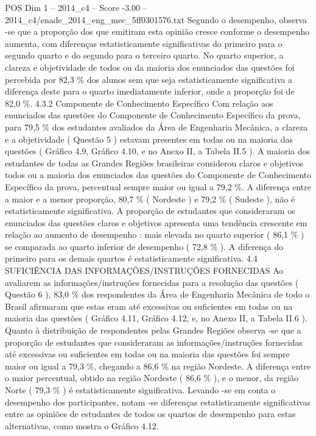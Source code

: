 \begin{textsample}{POS Dim 1 – 2014\_c4 – Score -3.00 – 2014\_c4/enade\_2014\_eng\_mec\_5ff0301576.txt}
Segundo o desempenho, observa -se que a proporção dos que emitiram esta opinião cresce conforme o desempenho aumenta, com diferenças estatisticamente significativas do primeiro para o segundo quarto e do segundo para o terceiro quarto.
No quarto superior, a clareza e objetividade de todos ou da maioria dos enunciados das questões foi percebida por 82,3 \% dos alunos sem que seja estatisticamente significativa a diferença deste para o quarto imediatamente inferior, onde a proporção foi de 82,0 \%. 4.3.2 Componente de Conhecimento Específico Com relação aos enunciados das questões do Componente de Conhecimento Específico da prova, para 79,5 \% dos estudantes avaliados da Área de Engenharia Mecânica, a clareza e a objetividade ( Questão 5 ) estavam presentes em todas ou na maioria das questões ( Gráfico 4.9, Gráfico 4.10, e no Anexo II, a Tabela II.5 ).
A maioria dos estudantes de todas as Grandes Regiões brasileiras considerou claros e objetivos todos ou a maioria dos enunciados das questões do Componente de Conhecimento Específico da prova, percentual sempre maior ou igual a 79,2 \%.
A diferença entre a maior e a menor proporção, 80,7 \% ( Nordeste ) e 79,2 \% ( Sudeste ), não é estatisticamente significativa.
A proporção de estudantes que consideraram os enunciados das questões claros e objetivos apresenta uma tendência crescente em relação ao aumento de desempenho : mais elevada no quarto superior ( 86,1 \% ) se comparada ao quarto inferior de desempenho ( 72,8 \% ).
A diferença do primeiro para os demais quartos é estatisticamente significativa. 4.4 SUFICIÊNCIA DAS INFORMAÇÕES/INSTRUÇÕES FORNECIDAS Ao avaliarem as informações/instruções fornecidas para a resolução das questões ( Questão 6 ), 83,0 \% dos respondentes da Área de Engenharia Mecânica de todo o Brasil afirmaram que estas eram até excessivas ou suficientes em todas ou na maioria das questões ( Gráfico 4.11, Gráfico 4.12, e, no Anexo II, a Tabela II.6 ).
Quanto à distribuição de respondentes pelas Grandes Regiões observa -se que a proporção de estudantes que consideraram as informações/instruções fornecidas até excessivas ou suficientes em todas ou na maioria das questões foi sempre maior ou igual a 79,3 \%, chegando a 86,6 \% na região Nordeste.
A diferença entre o maior percentual, obtido na região Nordeste ( 86,6 \% ), e o menor, da região Norte ( 79,3 \% ) é estatisticamente significativa.
Levando -se em conta o desempenho dos participantes, notam -se diferenças estatisticamente significativas entre as opiniões de estudantes de todos os quartos de desempenho para estas alternativas, como mostra o Gráfico 4.12.

\end{textsample}
